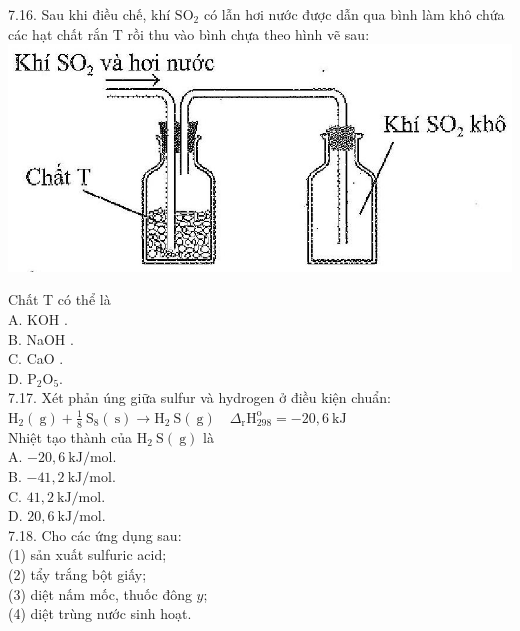 \documentclass[10pt]{article}
\begin{document}
7.16. Sau khi điều chế, khí $\mathrm{SO}_{2}$ có lẫn hơi nước được dẫn qua bình làm khô chứa các hạt chất rắn T rồi thu vào bình chựa theo hình vẽ sau:\\
\includegraphics[max width=\textwidth, center]{2025_10_23_fa9073eecee116ad8cf2g-24(1)}

Chất T có thể là\\
A. KOH .\\
B. NaOH .\\
C. CaO .\\
D. $\mathrm{P}_{2} \mathrm{O}_{5}$.\\
7.17. Xét phản úng giữa sulfur và hydrogen ở điều kiện chuẩn:\\
$\mathrm{H}_{2}(\mathrm{~g})+\frac{1}{8} \mathrm{~S}_{8}(\mathrm{~s}) \longrightarrow \mathrm{H}_{2} \mathrm{~S}(\mathrm{~g}) \quad \Delta_{\mathrm{r}} \mathrm{H}_{298}^{\mathrm{o}}=-20,6 \mathrm{~kJ}$\\
Nhiệt tạo thành của $\mathrm{H}_{2} \mathrm{~S}(\mathrm{~g})$ là\\
A. $-20,6 \mathrm{~kJ} / \mathrm{mol}$.\\
B. $-41,2 \mathrm{~kJ} / \mathrm{mol}$.\\
C. $41,2 \mathrm{~kJ} / \mathrm{mol}$.\\
D. $20,6 \mathrm{~kJ} / \mathrm{mol}$.\\
7.18. Cho các ứng dụng sau:\\
(1) sản xuất sulfuric acid;\\
(2) tẩy trắng bột giấy;\\
(3) diệt nấm mốc, thuốc đông $y$;\\
(4) diệt trùng nước sinh hoạt.
\end{document}
